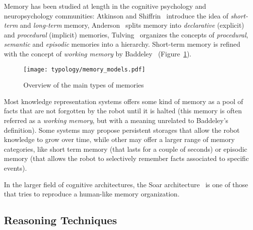 Memory has been studied at length in the cognitive psychology and
neuropsychology communities: Atkinson and Shiffrin~\cite{Atkinson1968}
introduce the idea of \emph{short-term} and \emph{long-term} memory,
Anderson~\cite{Anderson1976} splits memory into \emph{declarative} (explicit)
and \emph{procedural} (implicit) memories, Tulving~\cite{Tulving1985} organizes
the concepts of \emph{procedural}, \emph{semantic} and \emph{episodic} memories
into a hierarchy. Short-term memory is refined with the concept of
\emph{working memory} by Baddeley~\cite{Baddeley2010}
(Figure~\ref{fig|memory_models}).

\begin{figure}
    \centering
    \texttt{[image: typology/memory\_models.pdf]}
    \caption{Overview of the main types of memories}
    \label{fig|memory_models}
\end{figure}

Most knowledge representation systems offers some kind of memory as a pool of
facts that are not forgotten by the robot until it is halted (this memory is
often referred as a \emph{working memory}, but with a meaning unrelated to
Baddeley's definition). Some systems may propose persistent storages that allow
the robot knowledge to grow over time, while other may offer a larger range of
memory categories, like short term memory (that lasts for a couple of seconds)
or episodic memory (that allows the robot to selectively remember facts
associated to specific events).

In the larger field of cognitive architectures, the {\sc Soar}
architecture~\cite{Lehman2006} is one of those that tries to reproduce a
human-like memory organization.

\subsection{Reasoning Techniques}
\label{sect|reasoning}

\begin{scriptsize}
\begin{center}
\end{center}
\end{scriptsize}


